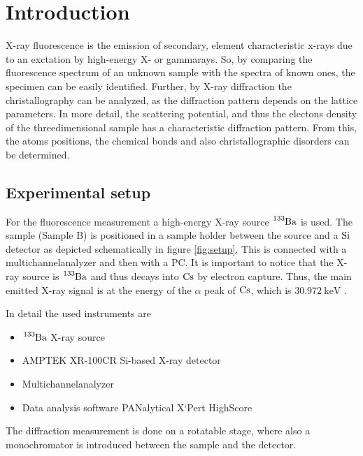 


\section{Introduction}
\label{sec:Introduction}

X-ray fluorescence is the emission of secondary, element characteristic x-rays due to an exctation by high-energy X- or gammarays.
So, by comparing the fluorescence spectrum of an unknown sample with the spectra of known ones, the specimen can be easily identified.
Further, by X-ray diffraction the christallography can be analyzed, as the diffraction pattern depends on the lattice parameters.
In more detail, the scattering potential, and thus the electons density of the threedimensional sample has a characteristic diffraction pattern.
From this, the atoms positions, the chemical bonds and also christallographic disorders can be determined.

\subsection{Experimental setup}
\label{sec:setup}

For the fluorescence measurement a high-energy X-ray source $\ce{^{133}Ba}$ is used. 
The sample (Sample B) is positioned in a sample holder between the source and a $\ce{Si}$ detector as depicted schematically in figure \ref{fig:setup}.
This is connected with a multichannelanalyzer and then with a PC.
It is important to notice that the X-ray source is $\ce{^{133}Ba}$ and thus decays into $\ce{Cs}$ by electron capture.
Thus, the main emitted X-ray signal is at the energy of the $\alpha$ peak of $\ce{Cs}$, which is $\SI{30.972}{\kilo\eV}$ \cite{Ba-source}.

In detail the used instruments are
\begin{itemize}
    \item $\ce{^{133}Ba}$ X-ray source
    \item AMPTEK XR-100CR Si-based X-ray detector
    \item Multichannelanalyzer
    \item Data analysis software PANalytical X`Pert HighScore
\end{itemize}
The diffraction measurement is done on a rotatable stage, where also a monochromator is introduced between the sample and the detector.

